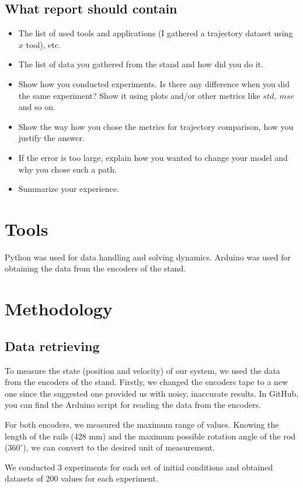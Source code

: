 \documentclass{article}
\begin{document}
\subsection{What report should contain}
\begin{itemize}
\item The list of used tools and applications (I gathered a trajectory dataset using $x$ tool), etc.
\item The list of data you gathered from the stand and how did you do it.
\item Show how you conducted experiments. Is there any difference when you did the same experiment? Show it using plots and/or other metrics like $std,\ mse$ and so on.
\item Show the way how you chose the metrics for trajectory comparison, how you justify the answer.
\item If the error is too large, explain how you wanted to change your model and why you chose such a path.
\item Summarize your experience.
\end{itemize}

\section{Tools}
Python was used for data handling and solving dynamics.
Arduino was used for obtaining the data from the encoders of the stand.

\section{Methodology}

\subsection{Data retrieving}

To measure the state (position and velocity) of our system, we used the data from the encoders of the stand. 
Firstly, we changed the encoders tape to a new one since the suggested one provided us with noisy, inaccurate results.
In GitHub, you can find the Arduino script for reading the data from the encoders.

For both encoders, we measured the maximum range of values. Knowing the length of the rails 
(428 mm) and the maximum possible rotation angle of the rod ($360^\circ$), we can convert to the desired unit of measurement.

We conducted 3 experiments for each set of initial conditions and obtained datasets of 200 values for each experiment.
\end{document}

